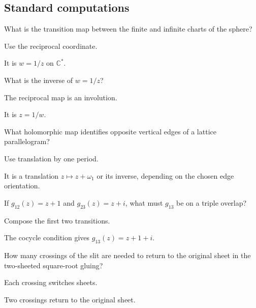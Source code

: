 \subsection*{Standard computations}

\begin{exercise}\label{exr:iv25-expand-01}
What is the transition map between the finite and infinite charts of the sphere?
\end{exercise}
\begin{hint}
Use the reciprocal coordinate.
\end{hint}
\begin{solution}
It is \(w=1/z\) on \(\mathbb C^*\).
\end{solution}

\begin{exercise}\label{exr:iv25-expand-02}
What is the inverse of \(w=1/z\)?
\end{exercise}
\begin{hint}
The reciprocal map is an involution.
\end{hint}
\begin{solution}
It is \(z=1/w\).
\end{solution}

\begin{exercise}\label{exr:iv25-expand-03}
What holomorphic map identifies opposite vertical edges of a lattice parallelogram?
\end{exercise}
\begin{hint}
Use translation by one period.
\end{hint}
\begin{solution}
It is a translation \(z\mapsto z+\omega_1\) or its inverse, depending on the chosen edge orientation.
\end{solution}

\begin{exercise}\label{exr:iv25-expand-04}
If \(g_{12}(z)=z+1\) and \(g_{23}(z)=z+i\), what must \(g_{13}\) be on a triple overlap?
\end{exercise}
\begin{hint}
Compose the first two transitions.
\end{hint}
\begin{solution}
The cocycle condition gives \(g_{13}(z)=z+1+i\).
\end{solution}

\begin{exercise}\label{exr:iv25-expand-05}
How many crossings of the slit are needed to return to the original sheet in the two-sheeted square-root gluing?
\end{exercise}
\begin{hint}
Each crossing switches sheets.
\end{hint}
\begin{solution}
Two crossings return to the original sheet.
\end{solution}

